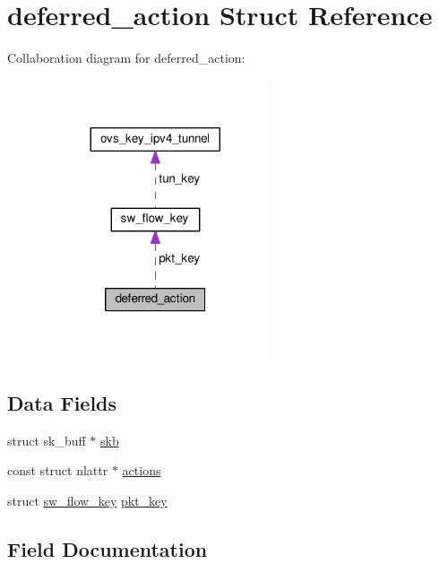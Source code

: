 \hypertarget{structdeferred__action}{}\section{deferred\+\_\+action Struct Reference}
\label{structdeferred__action}


Collaboration diagram for deferred\+\_\+action\+:
\nopagebreak
\begin{figure}[H]
\begin{center}
\leavevmode
\includegraphics[width=188pt]{structdeferred__action__coll__graph}
\end{center}
\end{figure}
\subsection*{Data Fields}
\begin{DoxyCompactItemize}
\item 
struct sk\+\_\+buff $\ast$ \hyperlink{structdeferred__action_acba4fd12fba3d60b6f4c7f2f3159f316}{skb}
\item 
const struct nlattr $\ast$ \hyperlink{structdeferred__action_a9cb4d3dde378a66035e7b17f017d9f89}{actions}
\item 
struct \hyperlink{structsw__flow__key}{sw\+\_\+flow\+\_\+key} \hyperlink{structdeferred__action_a4685f782001923a8f8c20510126b4c21}{pkt\+\_\+key}
\end{DoxyCompactItemize}


\subsection{Field Documentation}
\hypertarget{structdeferred__action_a9cb4d3dde378a66035e7b17f017d9f89}{}
